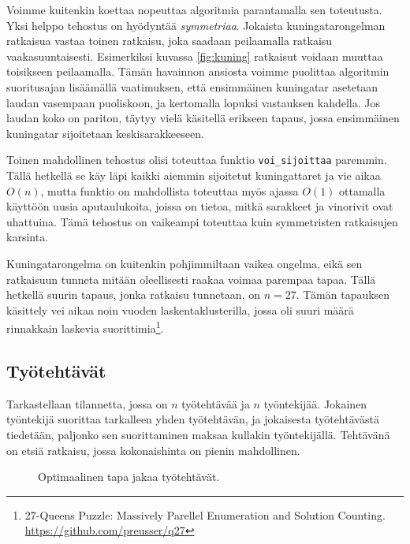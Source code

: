 Voimme kuitenkin koettaa nopeuttaa algoritmia parantamalla
sen toteutusta.
Yksi helppo tehostus on hyödyntää \emph{symmetriaa}.
Jokaista kuningatarongelman ratkaisua vastaa toinen ratkaisu,
joka saadaan peilaamalla ratkaisu vaakasuuntaisesti.
Esimerkiksi kuvassa \ref{fig:kuning} ratkaisut voidaan muuttaa
toisikseen peilaamalla.
Tämän havainnon ansiosta voimme puolittaa algoritmin suoritusajan
lisäämällä vaatimuksen, että ensimmäinen kuningatar asetetaan
laudan vasempaan puoliskoon, ja kertomalla lopuksi vastauksen kahdella.
Jos laudan koko on pariton, täytyy vielä käsitellä erikseen tapaus,
jossa ensimmäinen kuningatar sijoitetaan keskisarakkeeseen.

Toinen mahdollinen tehostus olisi toteuttaa funktio
\texttt{voi\_sijoittaa} paremmin.
Tällä hetkellä se käy läpi kaikki aiemmin sijoitetut kuningattaret
ja vie aikaa $O(n)$, mutta funktio on mahdollista toteuttaa myös
ajassa $O(1)$ ottamalla käyttöön uusia aputaulukoita, joissa on tietoa,
mitkä sarakkeet ja vinorivit ovat uhattuina.
Tämä tehostus on vaikeampi toteuttaa kuin symmetristen ratkaisujen karsinta.

Kuningatarongelma on kuitenkin pohjimmiltaan vaikea ongelma,
eikä sen ratkaisuun tunneta mitään oleellisesti raakaa voimaa
parempaa tapaa.
Tällä hetkellä suurin tapaus, jonka ratkaisu tunnetaan, on $n=27$.
Tämän tapauksen käsittely vei aikaa noin vuoden laskentaklusterilla,
jossa oli suuri määrä rinnakkain laskevia
suorittimia\footnote{27-Queens Puzzle: Massively Parellel Enumeration and Solution Counting.
\url{https://github.com/preusser/q27}}.

\subsection{Työtehtävät}

Tarkastellaan tilannetta, jossa on $n$ työtehtävää ja
$n$ työntekijää.
Jokainen työntekijä suorittaa tarkalleen yhden työtehtävän,
ja jokaisesta työtehtävästä tiedetään,
paljonko sen suorittaminen maksaa kullakin työntekijällä.
Tehtä\-vänä on etsiä ratkaisu, jossa kokonaishinta on pienin mahdollinen.

\begin{figure}
\center
{}
\caption{Optimaalinen tapa jakaa työtehtävät.}
\label{fig:tyoteh}
\end{figure}

